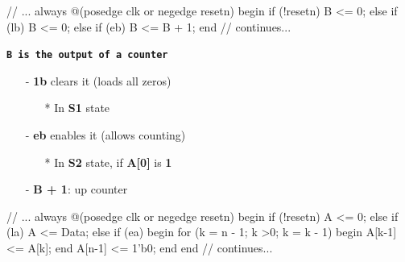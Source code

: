 \documentclass[12pt,openany]{book}
\begin{document}
\begin{minipage}[htp]{0.4\textwidth}
\begin{vhdl}
// ...
always @(posedge clk or negedge resetn) begin
	if (!resetn) B <= 0;
	else if (lb) B <= 0;
	else if (eb) B <= B + 1;
end
// continues...
\end{vhdl}
\end{minipage}
\hfill
\vline
\hfill
\begin{minipage}[htp]{0.45\textwidth}
\begin{justify}
	\texttt{\textbf{B is the output of a counter}}
	\begin{itemize}
		\item[-] \textbf{1b} clears it (loads all zeros)
		\begin{itemize}
			\item[*] In \textbf{S1} state
		\end{itemize}
		\item[-] \textbf{eb} enables it (allows counting)
		\begin{itemize}
			\item[*] In \textbf{S2} state, if \textbf{A[0]} is \textbf{1}
		\end{itemize}
		\item[-] \textbf{B + 1}: up counter
	\end{itemize}
\end{justify}
\end{minipage}
\newline
\begin{minipage}[htp]{0.45\textwidth}
\begin{vhdl}
// ...
always @(posedge clk or negedge resetn) begin
	if (!resetn) A <= 0;
	else if (la) A <= Data;
	else if (ea) begin
		for (k = n - 1; k >0; k = k - 1) begin
			A[k-1] <= A[k];
		end
		A[n-1] <= 1'b0;
	end
end
// continues...
\end{vhdl}
\end{minipage}
\hfill
\vline
\hfill
\end{document}
